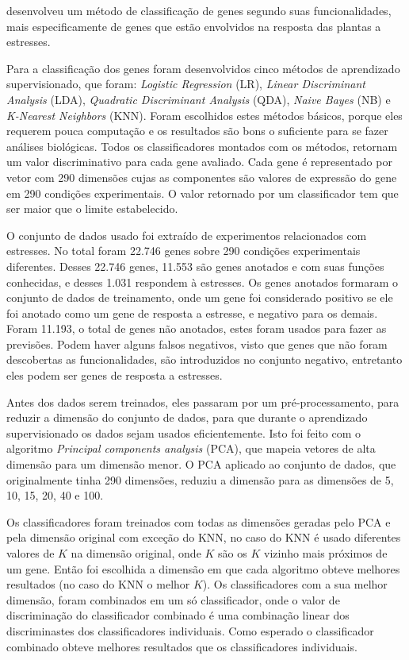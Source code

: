 

\cite{Lan2007} desenvolveu um método de classificação de genes segundo suas funcionalidades, mais especificamente de genes que estão envolvidos na resposta das plantas a estresses.

Para a classificação dos genes foram desenvolvidos cinco métodos de aprendizado supervisionado, que foram: \textit{Logistic Regression} (LR), \textit{Linear Discriminant Analysis} (LDA), \textit{Quadratic Discriminant Analysis} (QDA), \textit{Naive Bayes} (NB) e \textit{K-Nearest Neighbors} (KNN). Foram escolhidos estes métodos básicos, porque eles requerem pouca computação e os resultados são bons o suficiente para se fazer análises biológicas. Todos os classificadores montados com os métodos, retornam um valor discriminativo para cada gene avaliado. Cada gene é representado por vetor com 290 dimensões cujas as componentes são valores de expressão do gene em 290 condições experimentais. O valor retornado por um classificador tem que ser maior que o limite estabelecido.

O conjunto de dados usado foi extraído de experimentos relacionados com estresses. No total foram 22.746 genes sobre 290 condições experimentais diferentes. Desses 22.746 genes, 11.553 são genes anotados e com suas funções conhecidas, e desses 1.031 respondem à estresses. Os genes anotados formaram o conjunto de dados de treinamento, onde um gene foi considerado positivo se ele foi anotado como um gene de resposta a estresse, e negativo para os demais. Foram 11.193, o total de genes não anotados, estes foram usados para fazer as previsões. Podem haver alguns falsos negativos, visto que genes que não foram descobertas as funcionalidades, são introduzidos no conjunto negativo, entretanto eles podem ser genes de resposta a estresses.

Antes dos dados serem treinados, eles passaram por um pré-processamento, para reduzir a dimensão do conjunto de dados, para que durante o aprendizado supervisionado os dados sejam usados eficientemente. Isto foi feito com o algoritmo \textit{Principal components analysis} (PCA), que mapeia vetores de alta dimensão para um dimensão menor. O PCA aplicado ao conjunto de dados, que originalmente tinha 290 dimensões, reduziu a dimensão para as dimensões de 5, 10, 15, 20, 40 e 100.

Os classificadores foram treinados com todas as dimensões geradas pelo PCA e pela dimensão original com exceção do KNN, no caso do KNN é usado diferentes valores de $K$ na dimensão original, onde $K$ são os $K$ vizinho mais próximos de um gene. Então foi escolhida a dimensão em que cada algoritmo obteve melhores resultados (no caso do KNN o melhor $K$). Os classificadores com a sua melhor dimensão, foram combinados em um só classificador, onde o valor de discriminação do classificador combinado é uma combinação linear dos discriminastes dos classificadores individuais. Como esperado o classificador combinado obteve melhores resultados que os classificadores individuais.

